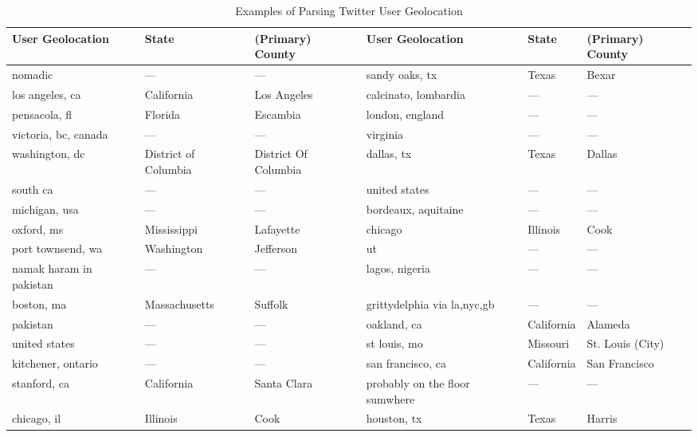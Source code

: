 \documentclass[manuscript,screen,nonacm,11pt,acm]{acmart}
\begin{document}
\begin{bibunit}
\normalsize

\begin{table}[ht]
	\centering \scriptsize \setlength\tabcolsep{2 pt}
	\caption{Examples of Parsing Twitter User Geolocation}
	\label{tab:examples-parseGeoLoc}
	\begin{adjustbox}{max width=\textwidth}
		\begin{tabular}{@{\hspace{0\tabcolsep}}lll|@{\hspace{3\tabcolsep}}lll@{\hspace{0\tabcolsep}}}
			\toprule\toprule
			User Geolocation                                      & State                & (Primary) County & User Geolocation                                      & State                & (Primary) County     \\
			\midrule
			nomadic & --- & --- & sandy oaks, tx & Texas & Bexar \\
			los angeles, ca & California & Los Angeles & calcinato, lombardia & --- & --- \\
			pensacola, fl & Florida & Escambia & london, england & --- & --- \\
			victoria, bc, canada & --- & --- & virginia & --- & --- \\
			washington, dc & District of Columbia & District Of Columbia & dallas, tx & Texas & Dallas \\
			south ca & --- & --- & united states & --- & --- \\
			michigan, usa & --- & --- & bordeaux, aquitaine & --- & --- \\
			oxford, ms & Mississippi & Lafayette & chicago & Illinois & Cook \\
			port townsend, wa & Washington & Jefferson & ut & --- & --- \\
			namak haram in pakistan & --- & --- & lagos, nigeria & --- & --- \\
			boston, ma & Massachusetts & Suffolk & grittydelphia via la,nyc,gb & --- & --- \\
			pakistan & --- & --- & oakland, ca & California & Alameda \\
			united states & --- & --- & st louis, mo & Missouri & St. Louis (City) \\
			kitchener, ontario & --- & --- & san francisco, ca & California & San Francisco \\
			stanford, ca & California & Santa Clara & probably on the floor sumwhere & --- & --- \\
			chicago, il & Illinois & Cook & houston, tx & Texas & Harris \\

\end{tabular}
\end{adjustbox}
\end{table}
\end{bibunit}
\end{document}
